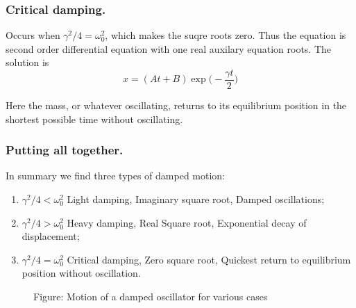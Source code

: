 \documentclass[../../../main.tex]{subfiles}
\begin{document}
\subsubsection{Critical damping.} Occurs when $\gamma^2/4 = \omega_0^2$, which makes the suqre roots zero. Thus the equation is second order differential equation with one real auxilary equation roots. The solution is
\begin{equation*}
    x=(At+B)\exp\biggl(-\frac{\gamma t}{2}\biggr)
\end{equation*}

Here the mass, or whatever oscillating, returns to its equilibrium position in the shortest possible time without oscillating. 

\subsubsection{Putting all together.} In summary we find three types of damped motion:
\begin{enumerate}
    \item $\gamma^2/4<\omega_0^2$ Light damping, Imaginary square root, Damped oscillations;
    \item $\gamma^2/4>\omega_0^2$ Heavy damping, Real Square root, Exponential decay of displacement;
    \item $\gamma^2/4=\omega_0^2$ Critical damping, Zero square root, Quickest return to equilibrium position without oscillation.
\end{enumerate} 
\begin{figure*}[h]
    \centering
    \caption*{Figure: Motion of a damped oscillator for various cases}
\end{figure*}
\end{document}
